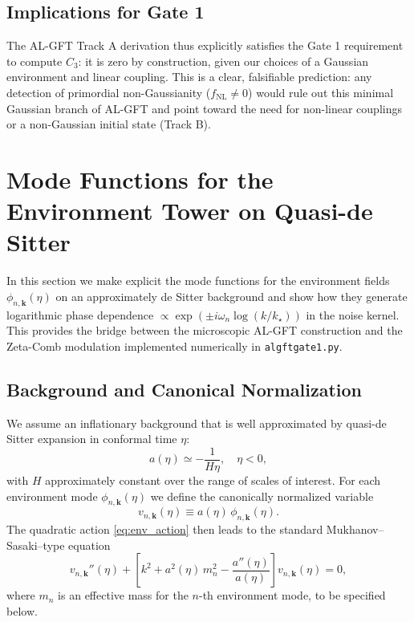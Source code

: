 \documentclass[12pt]{article}
\begin{document}
\subsection{Implications for Gate 1}
The AL-GFT Track A derivation thus explicitly satisfies the Gate 1 requirement to compute $C_3$: it is zero by construction, given our choices of a Gaussian environment and linear coupling. This is a clear, falsifiable prediction: any detection of primordial non-Gaussianity ($f_{\text{NL}} \neq 0$) would rule out this minimal Gaussian branch of AL-GFT and point toward the need for non-linear couplings or a non-Gaussian initial state (Track B).

\section{Mode Functions for the Environment Tower on Quasi-de Sitter}

In this section we make explicit the mode functions for the environment fields
\(\phi_{n,\bm{k}}(\eta)\) on an approximately de Sitter background and show how they
generate logarithmic phase dependence \(\propto \exp(\pm i \omega_n \log(k/k_\star))\)
in the noise kernel. This provides the bridge between the microscopic AL-GFT
construction and the Zeta-Comb modulation implemented numerically in
\texttt{algftgate1.py}.

\subsection{Background and Canonical Normalization}

We assume an inflationary background that is well approximated by quasi-de Sitter
expansion in conformal time \(\eta\):
\begin{equation}
a(\eta) \simeq -\frac{1}{H\eta}, 
\quad \eta < 0,
\label{eq:quasi_dS_scale_factor}
\end{equation}
with \(H\) approximately constant over the range of scales of interest.
For each environment mode \(\phi_{n,\bm{k}}(\eta)\) we define the canonically
normalized variable
\begin{equation}
v_{n,\bm{k}}(\eta) \equiv a(\eta)\,\phi_{n,\bm{k}}(\eta).
\end{equation}
The quadratic action \eqref{eq:env_action} then leads to the standard Mukhanov–Sasaki–type
equation
\begin{equation}
v_{n,\bm{k}}''(\eta) + \left[k^2 + a^2(\eta)\,m_n^2 - \frac{a''(\eta)}{a(\eta)}\right]
v_{n,\bm{k}}(\eta) = 0,
\label{eq:v_mode_eq_general}
\end{equation}
where \(m_n\) is an effective mass for the \(n\)-th environment mode, to be specified
below.
\end{document}
